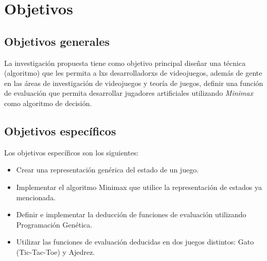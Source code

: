 \section{Objetivos}
  \subsection{Objetivos generales}
    La investigación propuesta tiene como objetivo principal diseñar una técnica (algoritmo) que les
    permita a lxs desarrolladorxs de videojuegos, además de gente en las áreas de investigación de
    videojuegos y teoría de juegos, definir una función de evaluación que permita desarrollar 
    jugadores artificiales utilizando \textit{Minimax} como algoritmo de decisión.
    
  \subsection{Objetivos específicos}
    Los objetivos específicos son los siguientes:
    
    \begin{itemize}
      \item Crear una representación genérica del estado de un juego.
      \item Implementar el algoritmo Minimax que utilice la representación de estados ya mencionada.
      \item Definir e implementar la deducción de funciones de evaluación utilizando Programación 
        Genética.
      \item Utilizar las funciones de evaluación deducidas en dos juegos distintos: Gato 
        (Tic-Tac-Toe) y Ajedrez.
    \end{itemize}
